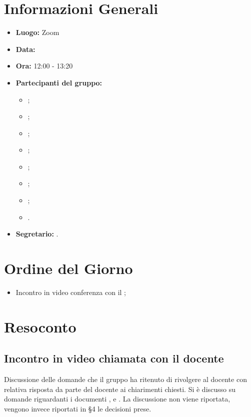 \section{Informazioni Generali}
\begin{itemize}
	\item \textbf{Luogo:} Zoom
	\item \textbf{Data:} \Data
	\item \textbf{Ora:} 12:00 - 13:20
	\item \textbf{Partecipanti del gruppo:}
	\begin{itemize}
		\item \AT{};
		\item \BR{};  
		\item \CE{}; 
		\item \DF{};
		\item \LD{};
		\item \MC{};
		\item \PF{};
		\item \SE{}.
	\end{itemize} 
	\item \textbf{Segretario:} \BR{}.
\end{itemize}

\section{Ordine del Giorno}
\begin{itemize}
	\item Incontro in video conferenza con il \VT{};
\end{itemize}

\section{Resoconto}

\subsection{Incontro in video chiamata con il docente}
Discussione delle domande che il gruppo ha ritenuto di rivolgere al docente con relativa risposta da parte del docente ai chiarimenti chiesti. Si è discusso su domande riguardanti i documenti \PdP, \NdP e \PdQ.
La discussione non viene riportata, vengono invece riportati in §4 le decisioni prese.

\clearpage
